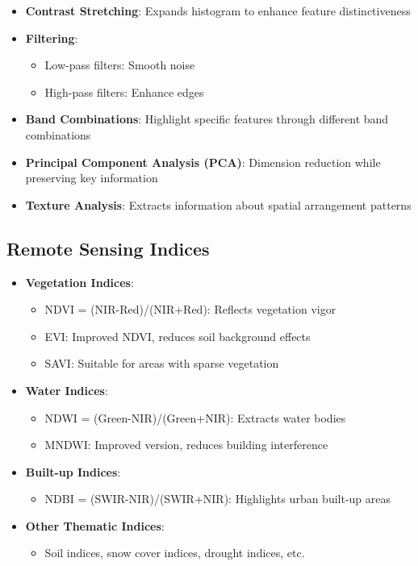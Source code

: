 \documentclass[
  letterpaper,
]{scrbook}
\providecommand{\tightlist}{%
  \setlength{\itemsep}{0pt}\setlength{\parskip}{0pt}}\usepackage{longtable,booktabs,array}
\begin{document}
\begin{itemize}
\tightlist
\item
  \textbf{Contrast Stretching}: Expands histogram to enhance feature
  distinctiveness
\item
  \textbf{Filtering}:

  \begin{itemize}
  \tightlist
  \item
    Low-pass filters: Smooth noise
  \item
    High-pass filters: Enhance edges
  \end{itemize}
\item
  \textbf{Band Combinations}: Highlight specific features through
  different band combinations
\item
  \textbf{Principal Component Analysis (PCA)}: Dimension reduction while
  preserving key information
\item
  \textbf{Texture Analysis}: Extracts information about spatial
  arrangement patterns
\end{itemize}

\subsection{Remote Sensing Indices}\label{remote-sensing-indices}

\begin{itemize}
\tightlist
\item
  \textbf{Vegetation Indices}:

  \begin{itemize}
  \tightlist
  \item
    NDVI = (NIR-Red)/(NIR+Red): Reflects vegetation vigor
  \item
    EVI: Improved NDVI, reduces soil background effects
  \item
    SAVI: Suitable for areas with sparse vegetation
  \end{itemize}
\item
  \textbf{Water Indices}:

  \begin{itemize}
  \tightlist
  \item
    NDWI = (Green-NIR)/(Green+NIR): Extracts water bodies
  \item
    MNDWI: Improved version, reduces building interference
  \end{itemize}
\item
  \textbf{Built-up Indices}:

  \begin{itemize}
  \tightlist
  \item
    NDBI = (SWIR-NIR)/(SWIR+NIR): Highlights urban built-up areas
  \end{itemize}
\item
  \textbf{Other Thematic Indices}:

  \begin{itemize}
  \tightlist
  \item
    Soil indices, snow cover indices, drought indices, etc.
  \end{itemize}
\end{itemize}
\end{document}
